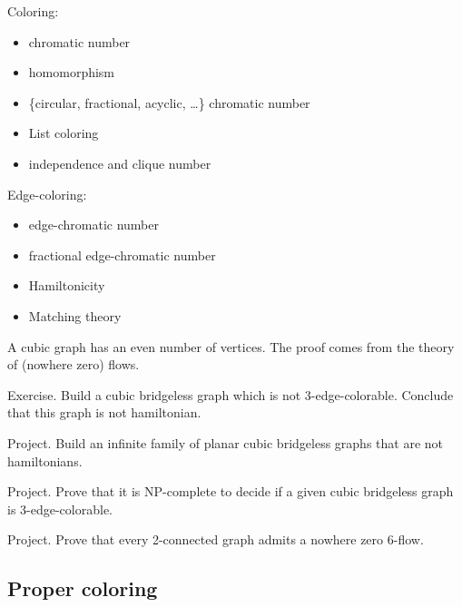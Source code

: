 \documentclass[12pt,a4paper]{article}
\begin{document}

Coloring:
\begin{itemize}
\item chromatic number
\item homomorphism
\item \{circular, fractional, acyclic, …\} chromatic number
\item List coloring
\item independence and clique number
\end{itemize}

Edge-coloring:
\begin{itemize}
\item edge-chromatic number
\item fractional edge-chromatic number
\item Hamiltonicity
\item Matching theory
\end{itemize}

A cubic graph has an even number of vertices. The proof comes from the theory of
(nowhere zero) flows.

Exercise. Build a cubic bridgeless graph which is not 3-edge-colorable. Conclude
that this graph is not hamiltonian.

Project. Build an infinite family of planar cubic bridgeless graphs that are not
hamiltonians.

Project. Prove that it is NP-complete to decide if a given cubic bridgeless
graph is 3-edge-colorable.

Project. Prove that every 2-connected graph admits a nowhere zero 6-flow.

\subsection{Proper coloring}

\begin{center}
\end{center}
\end{document}
